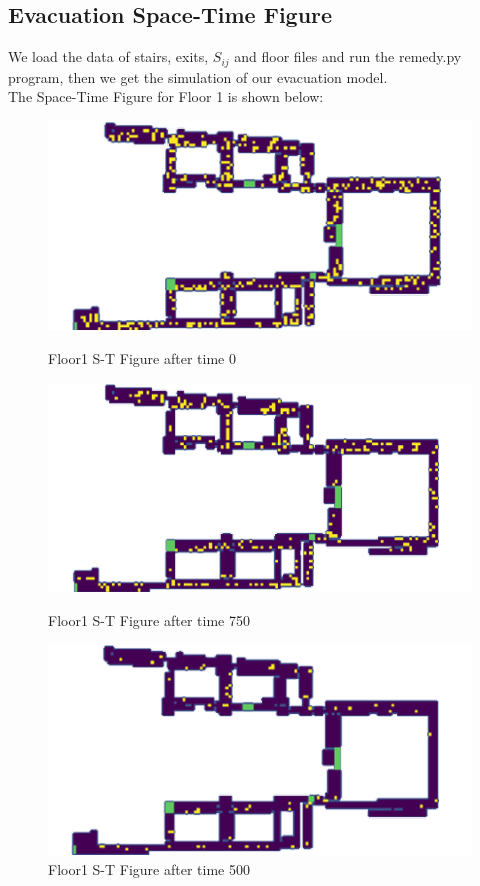 \documentclass{mcmthesis}
\begin{document}
\subsection{Evacuation Space-Time Figure}
We load the data of stairs, exits, $S_{ij}$ and floor files and run the remedy.py program, then we get the simulation of our evacuation model.\\
The Space-Time Figure for Floor 1 is shown below:
\begin{figure}[H]
\parbox[b]{.5\textwidth}{
\includegraphics[scale=0.7]{1-1}
\centering\captionsetup{font=small, labelfont=bf}\caption{Floor1 S-T Figure after time 0}
}
\parbox[b]{.5\textwidth}{
\includegraphics[scale=0.7]{1-2}
\centering\captionsetup{font=small, labelfont=bf}\caption{Floor1 S-T Figure after time 750}
}
\parbox[b]{.5\textwidth}{
\includegraphics[scale=0.7]{1-3}
\centering\captionsetup{font=small, labelfont=bf}\caption{Floor1 S-T Figure after time 500}
}
\end{figure}
\end{document}
